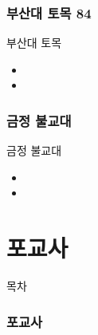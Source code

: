 \documentclass[aspectratio=1610,17pt,xcolor=pdftex,dvipsnames,table,handout]{beamer}
\begin{document}
		\section{부산대 토목 84}
		

		\begin{frame} [t,plain]
			\begin{block} {부산대 토목}
			\begin{itemize}
				\item 
				\item 
			\end{itemize}
			\end{block}
		\end{frame}


		\section{금정 불교대}
		

		\begin{frame} [t,plain]
			\begin{block} {금정 불교대}
			\begin{itemize}
				\item 
				\item 
			\end{itemize}
			\end{block}
		\end{frame}



		\part{포교사}
		\frame{\partpage}


		\begin{frame} [plain]{목차}
		\tableofcontents
		\end{frame}
		

		\section{포교사}
\end{document}
